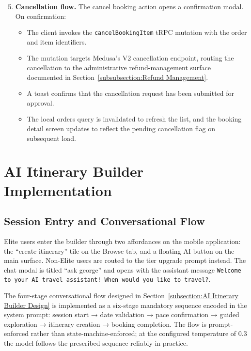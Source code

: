 \begin{enumerate}
  \setcounter{enumi}{4}
  \item \textbf{Cancellation flow.} The cancel booking action opens a confirmation modal. On confirmation:
    \begin{itemize}
      \item The client invokes the \texttt{cancelBookingItem} tRPC mutation with the order and item identifiers.
      \item The mutation targets Medusa's V2 cancellation endpoint, routing the cancellation to the administrative refund-management surface documented in Section~\ref{subsubsection:Refund Management}.
      \item A toast confirms that the cancellation request has been submitted for approval.
      \item The local orders query is invalidated to refresh the list, and the booking detail screen updates to reflect the pending cancellation flag on subsequent load.
    \end{itemize}
\end{enumerate}

\section{AI Itinerary Builder Implementation}
\subsection{Session Entry and Conversational Flow}
Elite users enter the builder through two affordances on the mobile application: the ``create itinerary'' tile on the Browse tab, and a floating AI button on the main surface. Non-Elite users are routed to the tier upgrade prompt instead. The chat modal is titled ``ask george'' and opens with the assistant message \texttt{Welcome to your AI travel assistant! When would you like to travel?}.

The four-stage conversational flow designed in Section~\ref{subsection:AI Itinerary Builder Design} is implemented as a six-stage mandatory sequence encoded in the system prompt: session start → date validation → pace confirmation → guided exploration → itinerary creation → booking completion. The flow is prompt-enforced rather than state-machine-enforced; at the configured temperature of 0.3 the model follows the prescribed sequence reliably in practice.

